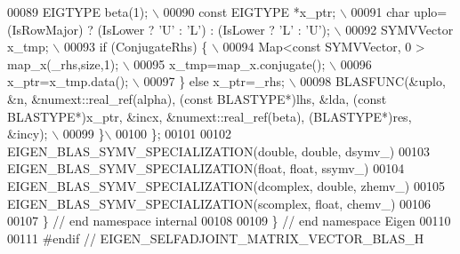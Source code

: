 \begin{DoxyCode}
00089 \textcolor{preprocessor}{  EIGTYPE beta(1); \(\backslash\)}
00090 \textcolor{preprocessor}{  const EIGTYPE *x\_ptr; \(\backslash\)}
00091 \textcolor{preprocessor}{  char uplo=(IsRowMajor) ? (IsLower ? 'U' : 'L') : (IsLower ? 'L' : 'U'); \(\backslash\)}
00092 \textcolor{preprocessor}{  SYMVVector x\_tmp; \(\backslash\)}
00093 \textcolor{preprocessor}{  if (ConjugateRhs) \{ \(\backslash\)}
00094 \textcolor{preprocessor}{    Map<const SYMVVector, 0 > map\_x(\_rhs,size,1); \(\backslash\)}
00095 \textcolor{preprocessor}{    x\_tmp=map\_x.conjugate(); \(\backslash\)}
00096 \textcolor{preprocessor}{    x\_ptr=x\_tmp.data(); \(\backslash\)}
00097 \textcolor{preprocessor}{  \} else x\_ptr=\_rhs; \(\backslash\)}
00098 \textcolor{preprocessor}{  BLASFUNC(&uplo, &n, &numext::real\_ref(alpha), (const BLASTYPE*)lhs, &lda, (const BLASTYPE*)x\_ptr, &incx,
       &numext::real\_ref(beta), (BLASTYPE*)res, &incy); \(\backslash\)}
00099 \textcolor{preprocessor}{\}\(\backslash\)}
00100 \textcolor{preprocessor}{\};}
00101 
00102 EIGEN\_BLAS\_SYMV\_SPECIALIZATION(\textcolor{keywordtype}{double},   \textcolor{keywordtype}{double}, dsymv\_)
00103 EIGEN\_BLAS\_SYMV\_SPECIALIZATION(\textcolor{keywordtype}{float},    \textcolor{keywordtype}{float},  ssymv\_)
00104 EIGEN\_BLAS\_SYMV\_SPECIALIZATION(dcomplex, \textcolor{keywordtype}{double}, zhemv\_)
00105 EIGEN\_BLAS\_SYMV\_SPECIALIZATION(scomplex, \textcolor{keywordtype}{float},  chemv\_)
00106 
00107 \} \textcolor{comment}{// end namespace internal}
00108 
00109 \} \textcolor{comment}{// end namespace Eigen}
00110 
00111 \textcolor{preprocessor}{#endif // EIGEN\_SELFADJOINT\_MATRIX\_VECTOR\_BLAS\_H}
\end{DoxyCode}
